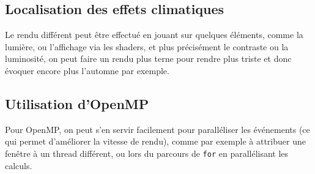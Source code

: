 \documentclass[a4paper,11pt]{report}
\begin{document}
	\subsection{Localisation des effets climatiques}
	Le rendu différent peut être effectué en jouant sur quelques éléments, comme la lumière, ou l'affichage via les shaders, et plus précisément le contraste ou la luminosité, on peut faire un rendu plus terne pour rendre plus triste et donc évoquer encore plus l'automne par exemple.	
	
	\subsection{Utilisation d'OpenMP}
	Pour OpenMP, on peut s'en servir facilement pour paralléliser les événements (ce qui permet d'améliorer la vitesse de rendu), comme par exemple à attribuer une fenêtre à un thread différent, ou lors du parcours de \texttt{for} en parallélisant les calculs.
		
	
\end{document}
